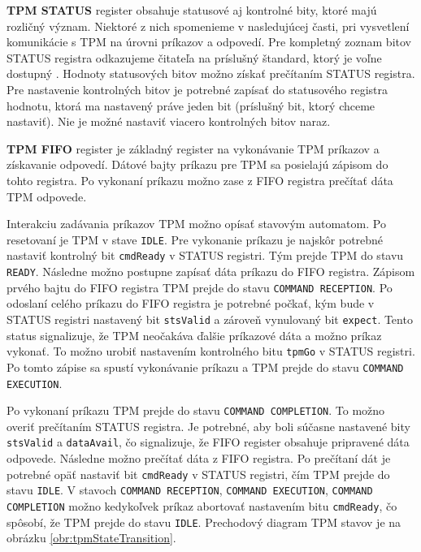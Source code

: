 \textbf{TPM STATUS} register obsahuje statusové aj kontrolné bity, ktoré majú rozličný význam. Niektoré z nich spomenieme v nasledujúcej časti, pri vysvetlení komunikácie s TPM na úrovni príkazov a odpovedí. Pre kompletný zoznam bitov STATUS registra odkazujeme čitateľa na príslušný štandard, ktorý je voľne dostupný \cite{tpmTis}. Hodnoty statusových bitov možno získať prečítaním STATUS registra. Pre nastavenie kontrolných bitov je potrebné zapísať do statusového registra hodnotu, ktorá ma nastavený práve jeden bit (príslušný bit, ktorý chceme nastaviť). Nie je možné nastaviť viacero kontrolných bitov naraz.

\textbf{TPM FIFO} register je základný register na vykonávanie TPM príkazov a získavanie odpovedí. Dátové bajty príkazu pre TPM sa posielajú zápisom do tohto registra. Po vykonaní príkazu možno zase z FIFO registra prečítať dáta TPM odpovede.

Interakciu zadávania príkazov TPM možno opísať stavovým automatom. Po resetovaní je TPM v stave \texttt{IDLE}. Pre vykonanie príkazu je najskôr potrebné nastaviť kontrolný bit \texttt{cmdReady} v STATUS registri. Tým prejde TPM do stavu \texttt{READY}. Následne možno postupne zapísať dáta príkazu do FIFO registra. Zápisom prvého bajtu do FIFO registra TPM prejde do stavu \texttt{COMMAND RECEPTION}. Po odoslaní celého príkazu do FIFO registra je potrebné počkať, kým bude v STATUS registri nastavený bit \texttt{stsValid} a zároveň vynulovaný bit \texttt{expect}. Tento status signalizuje, že TPM neočakáva ďalšie príkazové dáta a možno príkaz vykonať. To možno urobiť nastavením kontrolného bitu \texttt{tpmGo} v STATUS registri. Po tomto zápise sa spustí vykonávanie príkazu a TPM prejde do stavu \texttt{COMMAND EXECUTION}.

Po vykonaní príkazu TPM prejde do stavu \texttt{COMMAND COMPLETION}. To možno overiť prečítaním STATUS registra. Je potrebné, aby boli súčasne nastavené bity \texttt{stsValid} a \texttt{dataAvail}, čo signalizuje, že FIFO register obsahuje pripravené dáta odpovede. Následne možno prečítať dáta z FIFO registra. Po prečítaní dát je potrebné opäť nastaviť  bit \texttt{cmdReady} v STATUS registri, čím TPM prejde do stavu \texttt{IDLE}. V stavoch \texttt{COMMAND RECEPTION}, \texttt{COMMAND EXECUTION}, \texttt{COMMAND COMPLETION} možno kedykoľvek príkaz abortovať nastavením bitu \texttt{cmdReady}, čo spôsobí, že TPM prejde do stavu \texttt{IDLE}. Prechodový diagram TPM stavov je na obrázku \ref{obr:tpmStateTransition}.

